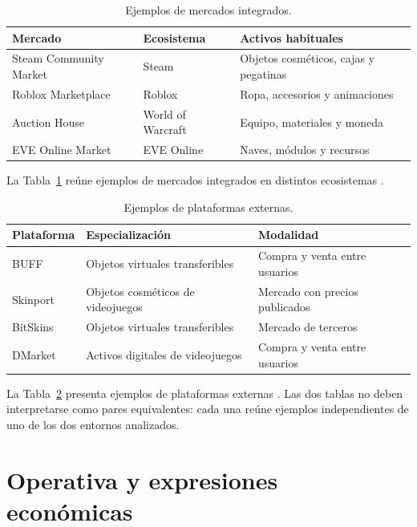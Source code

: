 \begin{table}[htbp]
\centering
\small
\begin{tabularx}{\textwidth}{@{}p{}p{}X@{}}
\toprule
\textbf{Mercado} & \textbf{Ecosistema} & \textbf{Activos habituales} \\
\midrule
Steam Community Market & Steam & Objetos cosméticos, cajas y pegatinas \\
Roblox Marketplace & Roblox & Ropa, accesorios y animaciones \\
Auction House & World of Warcraft & Equipo, materiales y moneda \\
EVE Online Market & EVE Online & Naves, módulos y recursos \\
\bottomrule
\end{tabularx}
\caption{Ejemplos de mercados integrados.}
\label{tab:mercados-integrados}
\end{table}

La Tabla~\ref{tab:mercados-integrados} reúne ejemplos de mercados integrados en distintos ecosistemas \cite{steamMarketFAQ,robloxMarketplace,blizzardAuctionHouse,eveMarketOrders}.

\begin{table}[htbp]
\centering
\small
\begin{tabularx}{\textwidth}{@{}p{}p{}X@{}}
\toprule
\textbf{Plataforma} & \textbf{Especialización} & \textbf{Modalidad} \\
\midrule
BUFF & Objetos virtuales transferibles & Compra y venta entre usuarios \\
Skinport & Objetos cosméticos de videojuegos & Mercado con precios publicados \\
BitSkins & Objetos virtuales transferibles & Mercado de terceros \\
DMarket & Activos digitales de videojuegos & Compra y venta entre usuarios \\
\bottomrule
\end{tabularx}
\caption{Ejemplos de plataformas externas.}
\label{tab:plataformas-externas}
\end{table}

La Tabla~\ref{tab:plataformas-externas} presenta ejemplos de plataformas externas \cite{buffMarketplace,skinportItemsApi,bitskinsMarketplace,dmarketMarketplace}. Las dos tablas no deben interpretarse como pares equivalentes: cada una reúne ejemplos independientes de uno de los dos entornos analizados.
\section{Operativa y expresiones económicas}

